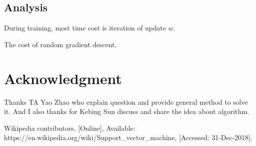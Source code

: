 \documentclass[conference,compsoc]{IEEEtran}
\begin{document}
\subsection{Analysis}
During training, most time cost is iteration of update $w$.

The cost of random gradient descent.


\section*{Acknowledgment}
Thanks TA Yao Zhao who explain question and provide general method to solve it.
And I also thanks for Kebing Sun discuss and share the idea about algorithm.


\begin{thebibliography}{1}
Wikipedia contributors, [Online], Available: https://en.wikipedia.org/wiki/Support\_vector\_machine, [Accessed: 31-Dec-2018].
\end{thebibliography}

\end{document}
